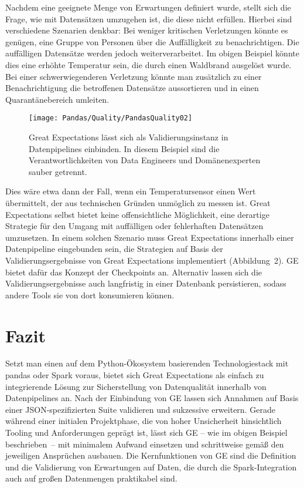 Nachdem eine geeignete Menge von Erwartungen definiert wurde, stellt sich die Frage, wie mit Datensätzen umzugehen ist, die diese nicht erfüllen. Hierbei sind verschiedene Szenarien denkbar: Bei weniger kritischen Verletzungen könnte es genügen, eine Gruppe von Personen über die Auffälligkeit zu benachrichtigen. Die auffälligen Datensätze werden jedoch weiterverarbeitet. Im obigen Beispiel könnte dies eine erhöhte Temperatur sein, die durch einen Waldbrand ausgelöst wurde. Bei einer schwerwiegenderen Verletzung könnte man zusätzlich zu einer Benachrichtigung die betroffenen Datensätze aussortieren und in einen Quarantänebereich umleiten.


\begin{figure}
	\texttt{[image: Pandas/Quality/PandasQuality02]}
	\caption{Great Expectations lässt sich als Validierungsinstanz in Datenpipelines einbinden. In diesem Beispiel sind die Verantwortlichkeiten von Data Engineers und Domänenexperten sauber getrennt.}
\end{figure}



	
Dies wäre etwa dann der Fall, wenn ein Temperatursensor einen Wert übermittelt, der aus technischen Gründen unmöglich zu messen ist. Great Expectations selbst bietet keine offensichtliche Möglichkeit, eine derartige Strategie für den Umgang mit auffälligen oder fehlerhaften Datensätzen umzusetzen. In einem solchen Szenario muss Great Expectations innerhalb einer Datenpipeline eingebunden sein, die Strategien auf Basis der Validierungsergebnisse von Great Expectations implementiert (Abbildung 2). GE bietet dafür das Konzept der Checkpoints an. Alternativ lassen sich die Validierungsergebnisse auch langfristig in einer Datenbank persistieren, sodass andere Tools sie von dort konsumieren können.

\section{Fazit}

	
Setzt man einen auf dem Python-Ökosystem basierenden Technologiestack mit pandas oder Spark voraus, bietet sich Great Expectations als einfach zu integrierende Lösung zur Sicherstellung von Datenqualität innerhalb von Datenpipelines an. Nach der Einbindung von GE lassen sich Annahmen auf Basis einer JSON-spezifizierten Suite validieren und sukzessive erweitern. Gerade während einer initialen Projektphase, die von hoher Unsicherheit hinsichtlich Tooling und Anforderungen geprägt ist, lässt sich GE – wie im obigen Beispiel beschrieben – mit minimalem Aufwand einsetzen und schrittweise gemäß den jeweiligen Ansprüchen ausbauen. Die Kernfunktionen von GE sind die Definition und die Validierung von Erwartungen auf Daten, die durch die Spark-Integration auch auf großen Datenmengen praktikabel sind.
	
